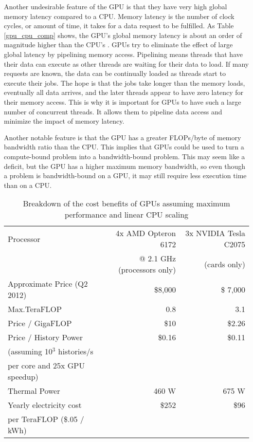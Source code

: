 Another undesirable feature of the GPU is that they have very high global memory latency compared to a CPU.  Memory latency is the number of clock cycles, or amount of time, it takes for a data request to be fulfilled.  As Table \ref{gpu_cpu_comp} shows, the GPU's global memory latency is about an order of magnitude higher than the CPU's \cite{cpu_latency,cuda}.  
GPUs try to eliminate the effect of large global latency by pipelining memory access.  Pipelining means threads that have their data can execute as other threads are waiting for their data to load.  If many requests are known, the data can be continually loaded as threads start to execute their jobs.  The hope is that the jobs take longer than the memory loads, eventually all data arrives, and the later threads appear to have zero latency for their memory access.  This is why it is important for GPUs to have such a large number of concurrent threads.  It allows them to pipeline data access and minimize the impact of memory latency.

Another notable feature is that the GPU has a greater FLOPs/byte of memory bandwidth ratio than the CPU.  This implies that GPUs could be used to turn a compute-bound problem into a bandwidth-bound problem.  This may seem like a deficit, but the GPU has a higher maximum memory bandwidth, so even though a problem is bandwidth-bound on a GPU, it may still require less execution time than on a CPU.

\begin{table}[h]
\centering
\caption{Breakdown of the cost benefits of GPUs assuming maximum performance and linear CPU scaling \cite{cost_sheets1,cost_sheets2,c2075,opterondate,opteronperformance}}
\label{gpu_money}
\begin{tabular}{| l | r | r |}
\hline
Processor & 4x AMD Opteron 6172  & 3x NVIDIA Tesla C2075 \\
  & @ 2.1 GHz (processors only) &  (cards only)  \\
\hline
\hline
Approximate Price (Q2 2012)& \$8,000 & \$ 7,000 \\
\hline
Max.TeraFLOP & 0.8 & 3.1 \\
\hline
Price / GigaFLOP & \$10 & \$2.26 \\
\hline
Price / History Power & \$0.16 & \$0.11 \\
(assuming 10$^3$ histories/s & & \\
per core and 25x GPU speedup) & & \\
\hline
Thermal Power & 460 W & 675 W \\
\hline
Yearly electricity cost & \$252  & \$96  \\
per TeraFLOP (\$.05 / kWh)   & & \\
\hline
\end{tabular}
\end{table}

